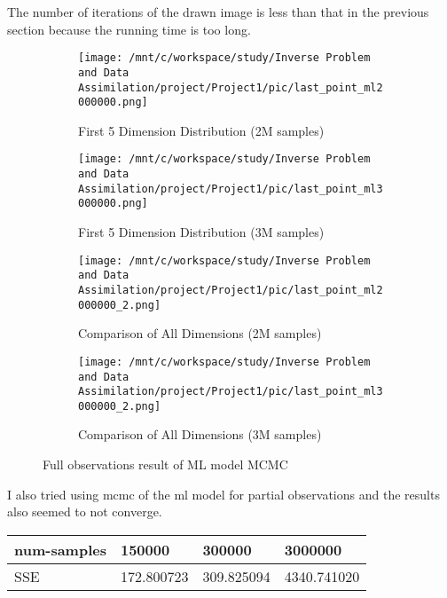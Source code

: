 \documentclass[11pt,reqno]{amsart}
\begin{document}
The number of iterations of the drawn image is less than that in the previous section because the running time is too long.
\begin{figure}[H] %
  \centering
  \begin{subfigure}[h]{0.45\textwidth}
      \centering
      \texttt{[image: /mnt/c/workspace/study/Inverse Problem and Data Assimilation/project/Project1/pic/last\_point\_ml2000000.png]} %
  \caption{First 5 Dimension Distribution (2M samples)}
      \label{fig:dim1-2m}
  \end{subfigure}
  \hfill
  \begin{subfigure}[h]{0.45\textwidth}
      \centering
      \texttt{[image: /mnt/c/workspace/study/Inverse Problem and Data Assimilation/project/Project1/pic/last\_point\_ml3000000.png]} %
  \caption{First 5 Dimension Distribution (3M samples)}
      \label{fig:dim1-3m}
  \end{subfigure}

  \begin{subfigure}[h]{0.4\textwidth}
      \centering
      \texttt{[image: /mnt/c/workspace/study/Inverse Problem and Data Assimilation/project/Project1/pic/last\_point\_ml2000000\_2.png]} %
  \caption{Comparison of All Dimensions (2M samples)}
      \label{fig:comparison-2m}
  \end{subfigure}
  \hfill
  \begin{subfigure}[h]{0.4\textwidth}
      \centering
      \texttt{[image: /mnt/c/workspace/study/Inverse Problem and Data Assimilation/project/Project1/pic/last\_point\_ml3000000\_2.png]} %
  \caption{Comparison of All Dimensions (3M samples)}
      \label{fig:comparison-3m}
  \end{subfigure}

  \caption{Full observations result of ML model MCMC}
  \label{fig:distribution-comparison_ml}
\end{figure}

I also tried using mcmc of the ml model for partial observations and the results also seemed to not converge.
\begin{table}[H]
  \begin{tabular}{|l|l|l|l|}
  \hline
  num-samples & 150000            & 300000            & 3000000            \\ \hline
  SSE         & 172.800723 & 309.825094 & 4340.741020\\ \hline
  \end{tabular}
\end{table}
\end{document}
